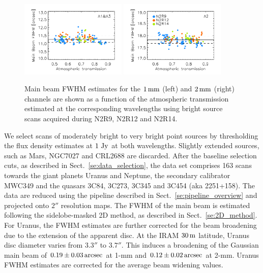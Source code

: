 \begin{figure}[ht!]
\begin{center}
  \includegraphics[clip, width=0.45\textwidth]{Figures/Beams/plot_FWHM_vs_atmtrans_mb_radius_binning2_1mm.pdf}
  \includegraphics[clip, width=0.45\textwidth]{Figures/Beams/plot_FWHM_vs_atmtrans_mb_radius_binning2_a2.pdf}
  \caption[Main Beam FWHM]{Main beam FWHM estimates for the
    $1\,\rm{mm}$ (left) and $2\,\rm{mm}$ (right) channels are shown as
    a function of the atmospheric transmission estimated at the
    corresponding wavelengths using bright source scans acquired during N2R9, N2R12 and N2R14. }
\label{fig:fwhm_map_atmtrans}
\end{center}
\end{figure}

We select scans of moderately bright to very bright point sources by
thresholding the flux density estimates at $1~\rm{Jy}$ at both
wavelengths. Slightly extended sources, such as Mars, NGC7027 and
CRL2688 are discarded. After the baseline selection cuts, as described in
Sect.~\ref{se:data_selection}, the data set comprises 163 scans
towards the giant planets Uranus and Neptune, the secondary calibrator
MWC349 and the quasars 3C84, 3C273, 3C345 and 3C454 (aka
2251+158). The data are reduced using the pipeline described in
Sect.~\ref{se:pipeline_overview} and projected onto $2''$ resolution
maps. The FWHM of the main beam is estimated following the
sidelobe-masked 2D method, as described in Sect.~\ref{se:2D_method}.
For Uranus, the
FWHM estimates are further corrected for the beam broadening due to the
extension of the apparent
disc. At the IRAM $30\,\rm{m}$ latitude, Uranus disc diameter varies
from $3.3''$ to $3.7''$. This induces a broadening of the Gaussian main beam of
$0.19 \pm 0.03\,\rm{arcsec}$ at 1-mm and $0.12 \pm 0.02\,\rm{arcsec}$
at 2-mm. Uranus FWHM estimates are corrected for the average beam
widening values.

